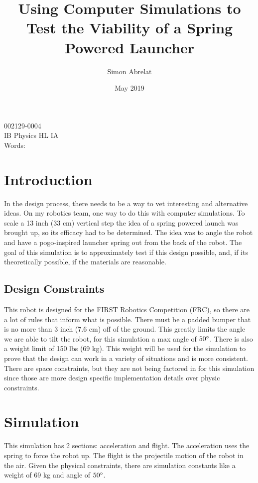 \documentclass[12pt, letterpaper]{article}
\title{Using Computer Simulations to Test the Viability of a Spring Powered Launcher}
\author{Simon Abrelat}
\date{May 2019}
\begin{document}
\large
\doublespace{}
\parindent=0.5in

{\fontsize{12}{14.4}
  {\singlespace
    \maketitle
    \begin{center}
    002129-0004 \\
    \vspace{4mm}
    IB Physics HL IA \\
    \vspace{4mm}
    Words:  \\ %
    \end{center}
  }
}	


\newpage
\tableofcontents
{}
\newpage

\section{Introduction} \label{sec:Introduction}
In the design process, there needs to be a way to vet interesting and alternative ideas. On my robotics team,
one way to do this with computer simulations. To scale a 13 inch (33 cm) vertical step the idea of a spring
powered launch was brought up, so its efficacy had to be determined. The idea was to angle the robot and have
a pogo-inspired launcher spring out from the back of the robot. The goal of this simulation is to
approximately test if this design possible, and, if its theoretically possible, if the materials are
reasonable.

\subsection{Design Constraints} \label{sec:DesignConstraints}
This robot is designed for the FIRST Robotics Competition (FRC), so there are a lot of rules that inform what
is possible. There must be a padded bumper that is no more than 3 inch (7.6 cm) off of the ground. This
greatly limits the angle we are able to tilt the robot, for this simulation a max angle of $50\degree$. There
is also a weight limit of 150 lbs (69 kg). This weight will be used for the simulation to prove that the
design can work in a variety of situations and is more consistent. There are space constraints, but they are
not being factored in for this simulation since those are more design specific implementation details over
physic constraints.

\section{Simulation} \label{Simulation}
This simulation has 2 sections: acceleration and flight. The acceleration uses the spring to force the robot
up. The flight is the projectile motion of the robot in the air. Given the physical constraints, there are
simulation constants like a weight of 69 kg and angle of $50\degree$.
\end{document}
